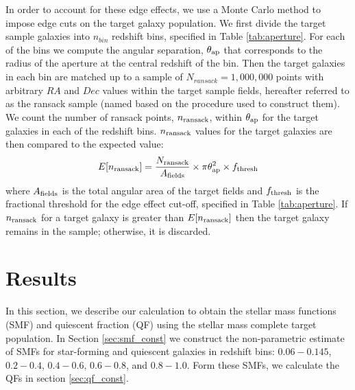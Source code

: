 \documentclass{emulateapj}
\begin{document}
In order to account for these edge effects, we use a Monte Carlo method to impose edge cuts on the target galaxy population. 
We first divide the target sample galaxies into $n_{bin}$ redshift bins, specified in Table \ref{tab:aperture}. 
For each of the bins we compute the angular separation, $\theta_{\rm{ap}}$ that corresponds to the radius of the aperture at the central redshift of the bin.
Then the target galaxies in each bin are matched up to a sample of $N_{ransack}=1,000,000$ points with arbitrary $RA$ and $Dec$ values within the target sample fields, 
hereafter referred to as the ransack sample (named based on the procedure used to construct them). 
We count the number of ransack points, $n_{\rm{ransack}}$, within $\theta_{\rm{ap}}$ for the target galaxies in each of the redshift bins.
$n_{\rm{ransack}}$ values for the target galaxies are then compared to the expected value:
\begin{equation} \label{eq:ransack}
E[n_{\rm{ransack}}] = \frac{N_{\rm{ransack}}}{A_{\rm{fields}}}\times {\pi \theta_{\rm{ap}}^2} \times f_{\rm{thresh}} 
\end{equation} 
where $A_{\rm{fields}}$ is the total angular area of the target fields and $f_{\rm{thresh}}$ is the fractional threshold for the edge effect cut-off, specified in Table 
\ref{tab:aperture}.
If $n_{\rm{ransack}}$ for a target galaxy is greater than $E[n_{\rm{ransack}}]$ then the target galaxy remains in the sample; otherwise, it is discarded. 

\section{Results}
In this section, we describe our calculation to obtain the stellar mass functions (SMF) and quiescent fraction (QF) using the stellar mass complete target population.
In Section \ref{sec:smf_const} we construct the non-parametric estimate of SMFs for star-forming and quiescent galaxies in redshift bins: $0.06-0.145$, $0.2-0.4$, 
$0.4-0.6$, $0.6-0.8$, and $0.8-1.0$.
Form these SMFs, we calculate the QFs in section \ref{sec:qf_const}.
\end{document}

